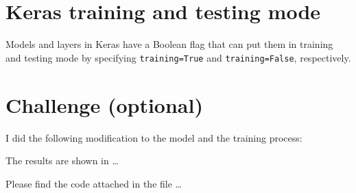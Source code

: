 \documentclass[a4paper,11pt]{article}
\newcommand{\code}[1]{\lstinline[columns=fixed]{#1}}
\begin{document}
\section{Keras training and testing mode}
Models and layers in Keras have a Boolean flag that can put them
in training and testing mode by specifying \code{training=True} and \code{training=False}, respectively.


\section{Challenge (optional)}
I did the following modification to the model and the training process:

The results are shown in \dots

Please find the code attached in the file \dots





\end{document}
